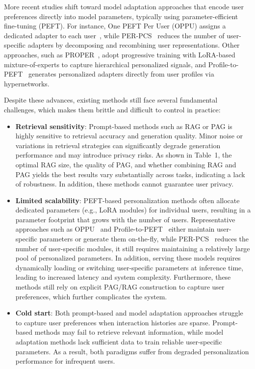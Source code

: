 \documentclass[11pt]{article}
\begin{document}
More recent studies shift toward model adaptation approaches that encode user preferences directly into model parameters, typically using parameter-efficient fine-tuning (PEFT). For instance, One PEFT Per User (OPPU) assigns a dedicated adapter to each user~\cite{tan2024democratizing}, while PER-PCS~\cite{tan2024personalized} reduces the number of user-specific adapters by decomposing and recombining user representations. Other approaches, such as PROPER~\cite{zhang2025proper}, adopt progressive training with LoRA-based mixture-of-experts to capture hierarchical personalized signals, and Profile-to-PEFT~\cite{tan2025instant} generates personalized adapters directly from user profiles via hypernetworks.

Despite these advances, existing methods still face several fundamental challenges, which makes them brittle and difficult to control in practice:

\begin{itemize}
    \setlength{\itemsep}{0pt}
    \setlength{\topsep}{0pt}
    \setlength{\parsep}{0pt}

\item \textbf{Retrieval sensitivity}: Prompt-based methods such as RAG or PAG is highly sensitive to retrieval accuracy and generation quality. Minor noise or variations in retrieval strategies can significantly degrade generation performance and may introduce privacy risks. As shown in Table~1, the optimal RAG size, the quality of PAG, and whether combining RAG and PAG yields the best results vary substantially across tasks, indicating a lack of robustness. In addition, these methods cannot guarantee user privacy. 

\item \textbf{Limited scalability}: 
PEFT-based personalization methods often allocate dedicated parameters (e.g., LoRA modules) for individual users, resulting in a parameter footprint that grows with the number of users. Representative approaches such as OPPU~\cite{tan2024democratizing} and Profile-to-PEFT~\cite{tan2025instant} either maintain user-specific parameters or generate them on-the-fly, while PER-PCS~\cite{tan2024personalized} reduces the number of user-specific modules, it still requires maintaining a relatively large pool of personalized parameters. In addition, serving these models requires dynamically loading or switching user-specific parameters at inference time, leading to increased latency and system complexity. Furthermore, these methods still rely on explicit PAG/RAG construction to capture user preferences, which further complicates the system.

\item \textbf{Cold start}: Both prompt-based and model adaptation approaches struggle to capture user preferences when interaction histories are sparse. Prompt-based methods may fail to retrieve relevant information, while model adaptation methods lack sufficient data to train reliable user-specific parameters. As a result, both paradigms suffer from degraded personalization performance for infrequent users.

\end{itemize}
\end{document}
